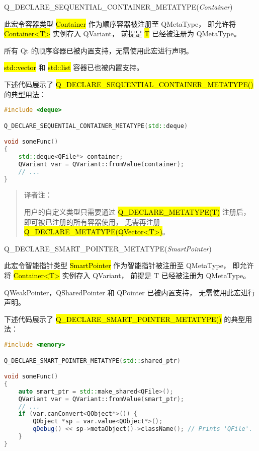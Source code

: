 Q\_DECLARE\_SEQUENTIAL\_CONTAINER\_METATYPE(\emph{Container})

此宏令容器类型 \hl{Container} 作为顺序容器被注册至 QMetaType，
即允许将 \hl{Container<T>} 实例存入 QVariant，
前提是 \hl{T} 已经被注册为 QMetaType。

\begin{notice}
所有 Qt 的顺序容器已被内置支持，无需使用此宏进行声明。
\end{notice}

\hl{std::vector} 和 \hl{std::list} 容器已也被内置支持。

下述代码展示了 \hl{Q\_DECLARE\_SEQUENTIAL\_CONTAINER\_METATYPE()} 的典型用法：

\begin{lstlisting}[language=C++]
#include <deque>

Q_DECLARE_SEQUENTIAL_CONTAINER_METATYPE(std::deque)

void someFunc()
{
    std::deque<QFile*> container;
    QVariant var = QVariant::fromValue(container);
    // ...
}
\end{lstlisting}

\begin{quote}
译者注：

用户的自定义类型只需要通过 \hl{Q\_DECLARE\_METATYPE(T)} 注册后，
即可被已注册的所有容器使用，
无需再注册 \hl{Q\_DECLARE\_METATYPE(QVector<T>)}。
\end{quote}

Q\_DECLARE\_SMART\_POINTER\_METATYPE(\emph{SmartPointer})

此宏令智能指针类型 \hl{SmartPointer} 作为智能指针被注册至 QMetaType，
即允许将 \hl{Container<T>} 实例存入 QVariant，
前提是 T 已经被注册为 QMetaType。

\begin{notice}
QWeakPointer，QSharedPointer 和 QPointer 已被内置支持，
无需使用此宏进行声明。
\end{notice}

下述代码展示了 \hl{Q\_DECLARE\_SMART\_POINTER\_METATYPE()} 的典型用法：

\begin{lstlisting}[language=C++]
#include <memory>

Q_DECLARE_SMART_POINTER_METATYPE(std::shared_ptr)

void someFunc()
{
    auto smart_ptr = std::make_shared<QFile>();
    QVariant var = QVariant::fromValue(smart_ptr);
    // ...
    if (var.canConvert<QObject*>()) {
        QObject *sp = var.value<QObject*>();
        qDebug() << sp->metaObject()->className(); // Prints 'QFile'.
    }
}
\end{lstlisting}

